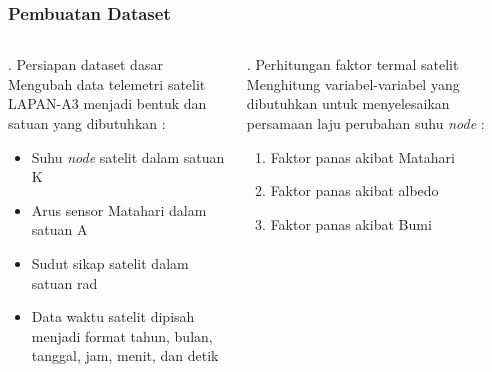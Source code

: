 \documentclass[8pt]{beamer}
\begin{document}
\begin{frame}
  \frametitle{Pembuatan Dataset}
  \begin{columns}[T]
    \begin{block}{. Persiapan dataset dasar}
      Mengubah data telemetri satelit LAPAN-A3 menjadi bentuk dan satuan yang dibutuhkan :
      \begin{itemize}
        \item Suhu \textit{node} satelit dalam satuan K
        \item Arus sensor Matahari dalam satuan A
        \item Sudut sikap satelit dalam satuan rad
        \item Data waktu satelit dipisah menjadi format tahun, bulan, tanggal, jam, menit, dan detik
      \end{itemize}
    \end{block}
    \begin{block}{. Perhitungan faktor termal satelit}
      Menghitung variabel-variabel yang dibutuhkan untuk menyelesaikan persamaan laju perubahan suhu \textit{node} :
      \begin{enumerate}
        \item Faktor panas akibat Matahari
        \item Faktor panas akibat albedo
        \item Faktor panas akibat Bumi
      \end{enumerate}
    \end{block}
  \end{columns}
\end{frame}
\end{document}
